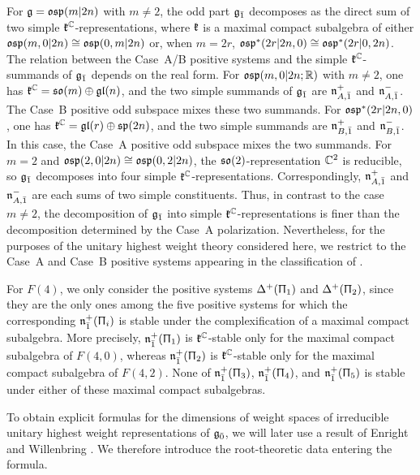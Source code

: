 For ${\mathfrak{g}}={\mathfrak{osp}}(m\vert 2n)$ with $m\neq2$, the odd part ${\mathfrak{g}_{\bar{1}}}$ decomposes as the direct sum of two simple ${\mathfrak k}^{{\mathbb C}}$-representations, where ${\mathfrak k}$ is a maximal compact subalgebra of either ${\mathfrak{osp}}(m,0\vert 2n)\cong{\mathfrak{osp}}(0,m\vert 2n)$ or, when $m=2r$, ${\mathfrak{osp}}^{\ast}(2r\vert 2n,0)\cong{\mathfrak{osp}}^{\ast}(2r\vert 0,2n)$. The relation between the Case~A/B positive systems and the simple ${\mathfrak k}^{{\mathbb C}}$-summands of ${\mathfrak{g}_{\bar{1}}}$ depends on the real form. For ${\mathfrak{osp}}(m,0\vert2n;{\mathbb R})$ with $m\neq2$, one has ${\mathfrak k}^{{\mathbb C}}={\mathfrak{so}}(m)\oplus{\mathfrak{gl}}(n)$, and the two simple summands of ${\mathfrak{g}_{\bar{1}}}$ are ${\mathfrak{n}}_{A,\bar1}^{+}$ and ${\mathfrak{n}}_{A,\bar1}^{-}$. The Case~B positive odd subspace mixes these two summands. For ${\mathfrak{osp}}^{\ast}(2r\vert2n,0)$, one has ${\mathfrak k}^{{\mathbb C}}={\mathfrak{gl}}(r)\oplus{\mathfrak{sp}}(2n)$, and the two simple summands are ${\mathfrak{n}}_{B,\bar1}^{+}$ and ${\mathfrak{n}}_{B,\bar1}^{-}$. In this case, the Case~A positive odd subspace mixes the two summands. For $m=2$ and ${\mathfrak{osp}}(2,0\vert 2n)\cong {\mathfrak{osp}}(0,2\vert 2n)$, the ${\mathfrak{so}}(2)$-representation ${\mathbb C}^{2}$ is reducible, so ${\mathfrak{g}_{\bar{1}}}$
decomposes into four simple ${\mathfrak k}^{{\mathbb C}}$-representations. Correspondingly,
${\mathfrak{n}}_{A,\bar1}^{+}$ and ${\mathfrak{n}}_{A,\bar1}^{-}$ are each sums of two simple
constituents. Thus, in contrast to the case $m\neq2$, the decomposition
of ${\mathfrak{g}_{\bar{1}}}$ into simple ${\mathfrak k}^{{\mathbb C}}$-representations is finer than the decomposition
determined by the Case~A polarization. Nevertheless, for the purposes of
the unitary highest weight theory considered here, we restrict to the
Case~A and Case~B positive systems appearing in the classification
of \cite{jakobsen1994full}.

For $F(4)$, we only consider the positive systems $\Delta^{+}(\Uppi_1)$ and
$\Delta^{+}(\Uppi_2)$, since they are the only ones among the five
positive systems for which the corresponding ${\mathfrak{n}}_{\bar{1}}^{+}(\Uppi_{i})$ is stable
under the complexification of a maximal compact subalgebra. More
precisely, ${\mathfrak{n}}_{\bar1}^{+}(\Uppi_1)$ is ${\mathfrak k}^{{\mathbb C}}$-stable only for
the maximal compact subalgebra of $F(4,0)$, whereas
${\mathfrak{n}}_{\bar1}^{+}(\Uppi_2)$ is ${\mathfrak k}^{{\mathbb C}}$-stable only for the maximal
compact subalgebra of $F(4,2)$. None of
${\mathfrak{n}}_{\bar1}^{+}(\Uppi_3)$, ${\mathfrak{n}}_{\bar1}^{+}(\Uppi_4)$, and
${\mathfrak{n}}_{\bar1}^{+}(\Uppi_5)$ is stable under either of these maximal
compact subalgebras.

To obtain explicit formulas for the dimensions of weight spaces of irreducible unitary highest weight representations of ${\mathfrak{g}_{\bar{0}}}$, we will later use a result of Enright and Willenbring \cite{Enright_Willenbring}. We therefore introduce the root-theoretic data entering the formula.

